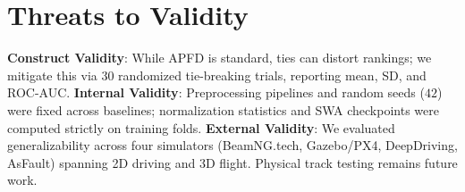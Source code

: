 \section{Threats to Validity}
\label{sec:threats}

\enlargethispage{4.5\baselineskip}
\textbf{Construct Validity}: While APFD is standard, ties can distort rankings; we mitigate this via 30 randomized tie-breaking trials, reporting mean, SD, and ROC-AUC. \textbf{Internal Validity}: Preprocessing pipelines and random seeds ($42$) were fixed across baselines; normalization statistics and SWA checkpoints were computed strictly on training folds. \textbf{External Validity}: We evaluated generalizability across four simulators (BeamNG.tech, Gazebo/\allowbreak PX4, DeepDriving, AsFault) spanning 2D driving and 3D flight. Physical track testing remains future work.

